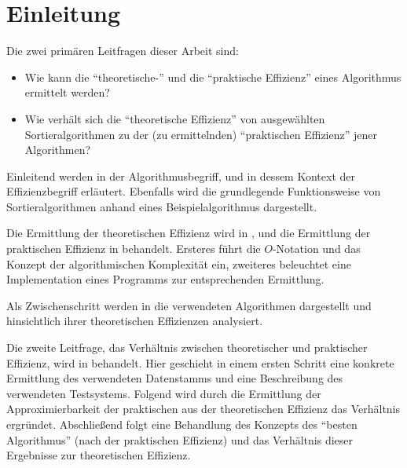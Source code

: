 \chapter*{Einleitung}


Die zwei primären Leitfragen dieser Arbeit sind:

\begin{itemize}
    \item Wie kann die \enquote{theoretische-} und die \enquote{praktische Effizienz} eines Algorithmus ermittelt werden?
    \item Wie verhält sich die \enquote{theoretische Effizienz} von ausgewählten Sortieralgorithmen zu der (zu ermittelnden) \enquote{praktischen Effizienz} jener Algorithmen?
\end{itemize}

Einleitend werden in  der Algorithmusbegriff, und in dessem Kontext der Effizienzbegriff erläutert. Ebenfalls wird die grundlegende Funktionsweise von Sortieralgorithmen anhand eines Beispielalgorithmus dargestellt.

Die Ermittlung der theoretischen Effizienz wird in , und die Ermittlung der praktischen Effizienz in  behandelt. Ersteres führt die $O$-Notation und das Konzept der algorithmischen Komplexität ein, zweiteres beleuchtet eine Implementation eines Programms zur entsprechenden Ermittlung.

Als Zwischenschritt werden in  die verwendeten Algorithmen dargestellt und hinsichtlich ihrer theoretischen Effizienzen analysiert.

Die zweite Leitfrage, das Verhältnis zwischen theoretischer und praktischer Effizienz, wird in  behandelt. Hier geschieht in einem ersten Schritt eine konkrete Ermittlung des verwendeten Datenstamms und eine Beschreibung des verwendeten Testsystems. Folgend wird durch die Ermittlung der Approximierbarkeit der praktischen aus der theoretischen Effizienz das Verhältnis ergründet. Abschließend folgt eine Behandlung des Konzepts des \enquote{besten Algorithmus} (nach der praktischen Effizienz) und das Verhältnis dieser Ergebnisse zur theoretischen Effizienz.

